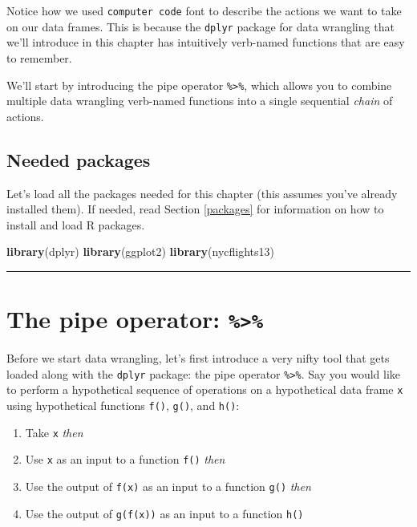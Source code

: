 \documentclass[12pt, krantz2,]{krantz}
\makeatletter
\newenvironment{Shaded}{\begin{snugshade}}{\end{snugshade}}
\newcommand{\KeywordTok}[1]{\textcolor[rgb]{0.27,0.27,0.27}{\textbf{#1}}}
\newcommand{\NormalTok}[1]{#1}
\providecommand{\tightlist}{%
  \setlength{\itemsep}{0pt}\setlength{\parskip}{0pt}}
\newenvironment{kframe}{%
\medskip{}
\setlength{\fboxsep}{.8em}
 \def\at@end@of@kframe{}%
 \ifinner\ifhmode%
  \def\at@end@of@kframe{\end{minipage}}%
  \begin{minipage}{\columnwidth}%
 \fi\fi%
 \def\FrameCommand##1{\hskip\@totalleftmargin \hskip-\fboxsep
 \colorbox{shadecolor}{##1}\hskip-\fboxsep
     \hskip-\linewidth \hskip-\@totalleftmargin \hskip\columnwidth}%
 \MakeFramed {\advance\hsize-\width
   \@totalleftmargin\z@ \linewidth\hsize
   \@setminipage}}%
 {\par\unskip\endMakeFramed%
 \at@end@of@kframe}
\renewenvironment{Shaded}{\begin{kframe}}{\end{kframe}}
\makeatother
\begin{document}
Notice how we used \texttt{computer\ code} font to describe the actions we want to take on our data frames. This is because the \texttt{dplyr} package for data wrangling that we'll introduce in this chapter has intuitively verb-named functions that are easy to remember.

We'll start by introducing the pipe operator \texttt{\%\textgreater{}\%}, which allows you to combine multiple data wrangling verb-named functions into a single sequential \emph{chain} of actions.

\hypertarget{needed-packages-1}{%
\subsection*{Needed packages}\label{needed-packages-1}}


Let's load all the packages needed for this chapter (this assumes you've already installed them). If needed, read Section \ref{packages} for information on how to install and load R packages.

\begin{Shaded}
\begin{Highlighting}[]
\KeywordTok{library}\NormalTok{(dplyr)}
\KeywordTok{library}\NormalTok{(ggplot2)}
\KeywordTok{library}\NormalTok{(nycflights13)}
\end{Highlighting}
\end{Shaded}

\begin{center}\rule{0.5\linewidth}{\linethickness}\end{center}

\hypertarget{piping}{%
\section{\texorpdfstring{The pipe operator: \texttt{\%\textgreater{}\%}}{The pipe operator: \%\textgreater{}\%}}\label{piping}}

Before we start data wrangling, let's first introduce a very nifty tool that gets loaded along with the \texttt{dplyr} package: the pipe operator \texttt{\%\textgreater{}\%}. Say you would like to perform a hypothetical sequence of operations on a hypothetical data frame \texttt{x} using hypothetical functions \texttt{f()}, \texttt{g()}, and \texttt{h()}:

\begin{enumerate}
\def\labelenumi{\arabic{enumi}.}
\tightlist
\item
  Take \texttt{x} \emph{then}
\item
  Use \texttt{x} as an input to a function \texttt{f()} \emph{then}
\item
  Use the output of \texttt{f(x)} as an input to a function \texttt{g()} \emph{then}
\item
  Use the output of \texttt{g(f(x))} as an input to a function \texttt{h()}
\end{enumerate}
\end{document}
